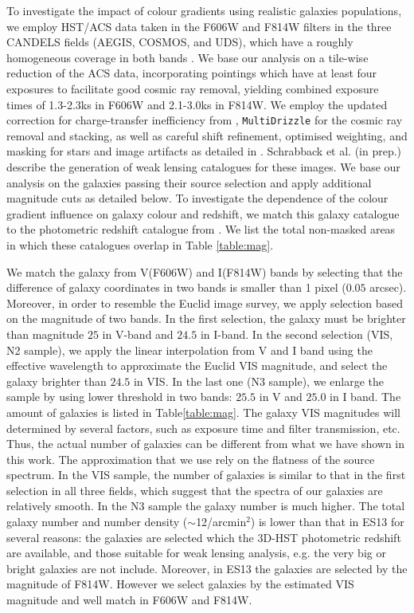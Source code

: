 \documentclass[useAMS,usenatbib]{mn2e}
\begin{document}
To investigate the impact of colour gradients using realistic galaxies
populations, we employ HST/ACS data taken in the F606W and F814W
filters in the three CANDELS fields (AEGIS, COSMOS, and UDS), which have
a roughly homogeneous coverage in both bands
\citep[see][]{davis2007,grogin2011,koekemoer11}. We base our analysis
on a tile-wise reduction of the ACS data, incorporating pointings
which have at least four exposures to facilitate good cosmic ray
removal, yielding combined exposure times of 1.3-2.3ks in F606W and
2.1-3.0ks in F814W.  We employ the updated correction for
charge-transfer inefficiency from \cite{massey2014},
\texttt{MultiDrizzle} \citep{koekemoer2003} for the cosmic ray removal
and stacking, as well as careful shift refinement, optimised
weighting, and masking for stars and image artifacts as detailed in
\cite{schrabback2010}.  Schrabback et al. (in prep.) describe the
generation of weak lensing catalogues for these images.  We base our
analysis on the galaxies passing their source selection and apply
additional magnitude cuts as detailed below. To investigate the
dependence of the colour gradient influence on galaxy colour and
redshift, we match this galaxy catalogue to the photometric redshift
catalogue from \cite{skelton14}.  We list the total non-masked areas
in which these catalogues overlap in Table \ref{table:mag}.


We match the galaxy from V(F606W) and I(F814W) bands by selecting that
the difference of galaxy coordinates in two bands is smaller than 1
pixel ($0.05$ arcsec). Moreover, in order to resemble the Euclid image
survey, we apply selection based on the magnitude of two bands. In the
first selection, the galaxy must be brighter than magnitude $25$ in
V-band and $24.5$ in I-band. In the second selection (VIS, N2 sample),
we apply the linear interpolation from V and I band using the
effective wavelength to approximate the Euclid VIS magnitude, and
select the galaxy brighter than $24.5$ in VIS. In the last one (N3
sample), we enlarge the sample by using lower threshold in two bands:
$25.5$ in V and $25.0$ in I band. The amount of galaxies is listed in
Table\ref{table:mag}.
%
The galaxy VIS magnitudes will determined by several factors, such as
exposure time and filter transmission, etc. Thus, the actual number of
galaxies can be different from what we have shown in this work. The
approximation that we use rely on the flatness of the source
spectrum. In the VIS sample, the number of galaxies is similar to that in
the first selection in all three fields, which suggest that the
spectra of our galaxies are relatively smooth. In the N3 sample the galaxy
number is much higher.
%
The total galaxy number and number density ($\sim$12/arcmin$^2$) is
lower than that in ES13 for several reasons: the galaxies are selected
which the 3D-HST photometric redshift are available, and those
suitable for weak lensing analysis, e.g. the very big or bright
galaxies are not include. Moreover, in ES13 the galaxies are selected
by the magnitude of F814W. However we select galaxies by the estimated
VIS magnitude and well match in F606W and F814W.
\end{document}
